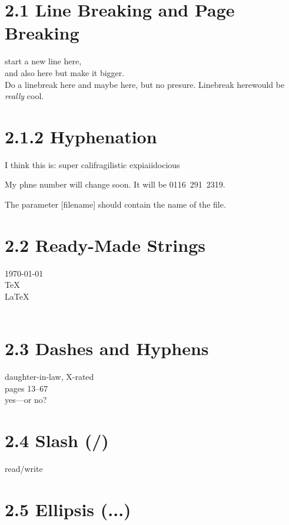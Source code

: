 \documentclass{article}
\begin{document}
\section{2.1 Line Breaking and Page Breaking}

start a new line here, \\
and also here but make 
it bigger.\\[1cm]
Do a linebreak here\linebreak
and maybe here, \linebreak[1]
but no presure.
Linebreak here\linebreak[3]
would be \emph{really} cool.

\section{2.1.2 Hyphenation}

I think this is: su\-per\-%
cal\-i\-frag\-i\-lis\-tic\-%
ex\-pi\-ai\-i\-do\-cious

My phne number will 
change soon. It will
be \mbox{0116 291 2319}.

The parameter 
\mbox{[filename]} should
contain the name of the file.

\section{2.2 Ready-Made Strings}

\today\\
\TeX \\
\LaTeX\\
\LaTeXe\\

\section{2.3 Dashes and Hyphens}

daughter-in-law,  X-rated\\
pages 13--67\\
yes---or no?

\section{2.4 Slash (/)}

read\slash write

\section{2.5 Ellipsis (...)}
\end{document}
